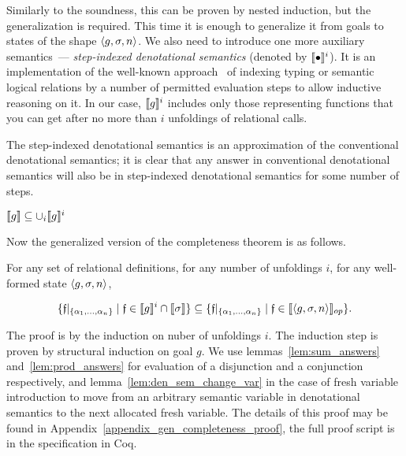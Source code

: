 Similarly to the soundness, this can be proven by nested induction, but the generalization is required. This time it is enough to generalize it from goals
to states of the shape $\left<{g, \sigma, n}\right>$. We also need to introduce one more auxiliary semantics~--- \emph{step-indexed denotational semantics} (denoted by $\llbracket{\bullet}\rrbracket^i$). It is an implementation of the well-known approach~\cite{StepIndexing} of indexing typing or semantic logical relations by a number of permitted evaluation steps to allow inductive reasoning on it.
In our case, $\llbracket{g}\rrbracket^i$ includes only those representing functions that you can get after no more than $i$ unfoldings of relational calls.

The step-indexed denotational semantics is an approximation of the conventional denotational semantics; it is clear that any answer in conventional denotational semantics will also be in step-indexed denotational semantics for some number of steps.

\begin{lemma}
$\llbracket{g}\rrbracket \subseteq \cup_i \llbracket{g}\rrbracket^i$
\end{lemma}

Now the generalized version of the completeness theorem is as follows.

\begin{lemma}
\label{lem:gen_completeness}
For any set of relational definitions, for any number of unfoldings $i$, for any well-formed state $\left<{g, \sigma, n}\right>$,

\[
\{\mathfrak{f}|_{\{\alpha_1,\dots,\alpha_n\}} \mid \mathfrak{f} \in \llbracket{g}\rrbracket^i \cap \llbracket{\sigma}\rrbracket\} \subseteq \{\mathfrak{f}|_{\{\alpha_1,\dots,\alpha_n\}} \mid \mathfrak{f} \in \llbracket{\left<{g, \sigma, n}\right>}\rrbracket_{op}\}.
\]
\end{lemma}

The proof is by the induction on nuber of unfoldings $i$. The induction step is proven by structural induction on goal $g$. We use lemmas~\ref{lem:sum_answers} and~\ref{lem:prod_answers} for evaluation of a disjunction and a conjunction respectively, and lemma~\ref{lem:den_sem_change_var} in the case of fresh variable introduction to move from an arbitrary semantic variable in denotational semantics to the next allocated fresh variable. The details of this proof may be found in Appendix~\ref{appendix_gen_completeness_proof}, the full proof script is in the specification in Coq.
